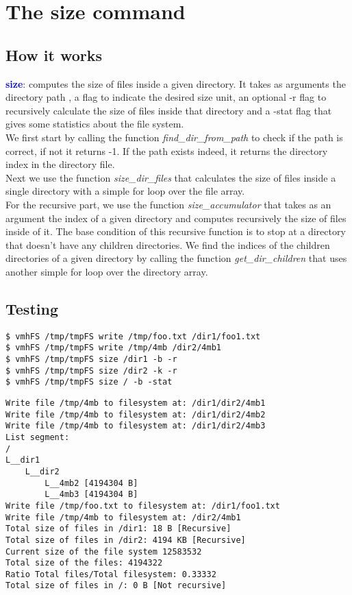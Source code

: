 \section{The size command}

\subsection{How it works}
\textcolor{blue}{\textbf{size}}: computes the size of files inside a given directory. It takes as arguments  the directory path , a flag to indicate the desired size unit, an optional  -r flag to recursively calculate the size of files inside that directory and a -stat flag that gives some statistics about the file system.  \\

We first start by calling the function \textit{find\_dir\_from\_path} to check if the path is correct, if not it returns -1. If the path exists indeed, it returns the directory index in the directory file.\\

Next we use the function \textit{size\_dir\_files} that calculates the size of files inside a single directory with a simple for loop over the file array.\\

For the recursive part, we use the function \textit{size\_accumulator} that takes as an argument the index of a given directory and computes recursively the size of files inside of it. The base condition of this recursive function is to stop at a directory that doesn't have any children directories. We find the indices of the children directories of a given directory by calling the function \textit{get\_dir\_children} that uses another simple for loop over the directory array.\\

\newpage
\subsection{Testing}
\begin{lstlisting}
$ vmhFS /tmp/tmpFS write /tmp/foo.txt /dir1/foo1.txt
$ vmhFS /tmp/tmpFS write /tmp/4mb /dir2/4mb1
$ vmhFS /tmp/tmpFS size /dir1 -b -r
$ vmhFS /tmp/tmpFS size /dir2 -k -r
$ vmhFS /tmp/tmpFS size / -b -stat
\end{lstlisting}

\begin{lstlisting}
Write file /tmp/4mb to filesystem at: /dir1/dir2/4mb1
Write file /tmp/4mb to filesystem at: /dir1/dir2/4mb2
Write file /tmp/4mb to filesystem at: /dir1/dir2/4mb3
List segment:
/
L__dir1
    L__dir2
        L__4mb2 [4194304 B]
        L__4mb3 [4194304 B]
Write file /tmp/foo.txt to filesystem at: /dir1/foo1.txt
Write file /tmp/4mb to filesystem at: /dir2/4mb1
Total size of files in /dir1: 18 B [Recursive]
Total size of files in /dir2: 4194 KB [Recursive]
Current size of the file system 12583532
Total size of the files: 4194322
Ratio Total files/Total filesystem: 0.33332
Total size of files in /: 0 B [Not recursive]
\end{lstlisting}

\newpage


